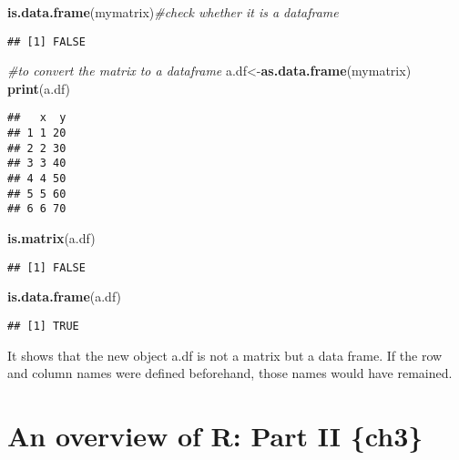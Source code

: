 \documentclass[]{book}
\newenvironment{Shaded}{\begin{snugshade}}{\end{snugshade}}
\newcommand{\KeywordTok}[1]{\textcolor[rgb]{0.13,0.29,0.53}{\textbf{#1}}}
\newcommand{\CommentTok}[1]{\textcolor[rgb]{0.56,0.35,0.01}{\textit{#1}}}
\newcommand{\NormalTok}[1]{#1}
\theoremstyle{definition}
\theoremstyle{definition}
\theoremstyle{definition}
\theoremstyle{remark}
\begin{document}
\begin{Shaded}
\begin{Highlighting}[]
\KeywordTok{is.data.frame}\NormalTok{(mymatrix)}\CommentTok{#check whether it is a dataframe}
\end{Highlighting}
\end{Shaded}

\begin{verbatim}
## [1] FALSE
\end{verbatim}

\begin{Shaded}
\begin{Highlighting}[]
\CommentTok{#to convert the matrix to a dataframe}
\NormalTok{a.df<-}\KeywordTok{as.data.frame}\NormalTok{(mymatrix)}
\KeywordTok{print}\NormalTok{(a.df)}
\end{Highlighting}
\end{Shaded}

\begin{verbatim}
##   x  y
## 1 1 20
## 2 2 30
## 3 3 40
## 4 4 50
## 5 5 60
## 6 6 70
\end{verbatim}

\begin{Shaded}
\begin{Highlighting}[]
\KeywordTok{is.matrix}\NormalTok{(a.df)}
\end{Highlighting}
\end{Shaded}

\begin{verbatim}
## [1] FALSE
\end{verbatim}

\begin{Shaded}
\begin{Highlighting}[]
\KeywordTok{is.data.frame}\NormalTok{(a.df)}
\end{Highlighting}
\end{Shaded}

\begin{verbatim}
## [1] TRUE
\end{verbatim}

It shows that the new object a.df is not a matrix but a data frame. If
the row and column names were defined beforehand, those names would have
remained.

\chapter{An overview of R: Part II
\{ch3\}}\label{an-overview-of-r-part-ii-ch3}
\end{document}
